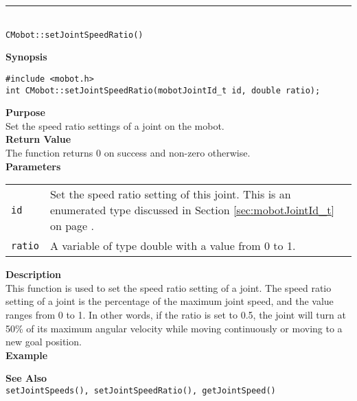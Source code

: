 \noindent
\vspace{5pt}
\rule{4.5in}{0.015in}\\
\noindent
{\LARGE \texttt{CMobot::setJointSpeedRatio()}}\\
{}

\noindent
{\bf Synopsis}
\vspace{-8pt}
\begin{verbatim}
#include <mobot.h>
int CMobot::setJointSpeedRatio(mobotJointId_t id, double ratio);
\end{verbatim}

\noindent
{\bf Purpose}\\
Set the speed ratio settings of a joint on the mobot.\\

\noindent
{\bf Return Value}\\
The function returns 0 on success and non-zero otherwise.\\

\noindent
{\bf Parameters}
\vspace{-0.1in}
\begin{description}
\item               
\begin{tabular}{p{10 mm}p{145 mm}}
\texttt{id} & Set the speed ratio setting of this joint. This is an 
enumerated type discussed in Section \ref{sec:mobotJointId_t} on page
\pageref{sec:mobotJointId_t}.\\
\texttt{ratio} & A variable of type double with a value from 0 to 1. 
\end{tabular}
\end{description}

\noindent
{\bf Description}\\
This function is used to set the speed ratio setting of a joint. The speed
ratio setting of a joint is the percentage of the maximum joint speed, and the
value ranges from 0 to 1. In other words, if the ratio is set to 0.5, the joint 
will turn at 50\% of its maximum angular velocity while moving continuously
or moving to a new goal position.\\

\noindent
{\bf Example}\\
\noindent

\noindent
{\bf See Also}\\
\texttt{setJointSpeeds(), setJointSpeedRatio(), getJointSpeed()}

